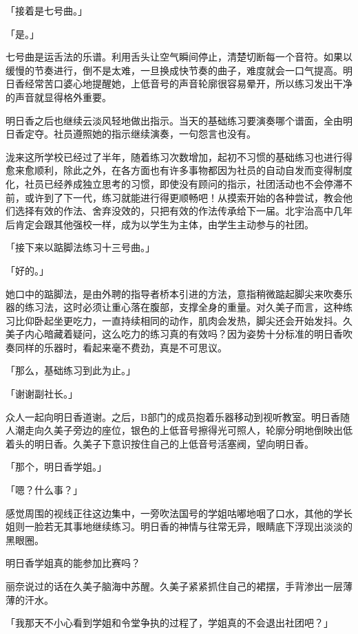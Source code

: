 \documentclass[UTF8]{ctexart}
\begin{document}
    「接着是七号曲。」 

    「是。」 

    七号曲是运舌法的乐谱。利用舌头让空气瞬间停止，清楚切断每一个音符。如果以缓慢的节奏进行，倒不是太难，一旦换成快节奏的曲子，难度就会一口气提高。明日香经常苦口婆心地提醒她，上低音号的声音轮廓很容易晕开，所以练习发出干净的声音就显得格外重要。 

    明日香之后也继续云淡风轻地做出指示。当天的基础练习要演奏哪个谱面，全由明日香定夺。社员遵照她的指示继续演奏，一句怨言也没有。 

    泷来这所学校已经过了半年，随着练习次数增加，起初不习惯的基础练习也进行得愈来愈顺利，除此之外，在各方面也有许多事物都因为社员的自动自发而变得制度化，社员已经养成独立思考的习惯，即使没有顾问的指示，社团活动也不会停滞不前，或许到了下一代，练习就能进行得更顺畅吧！从摸索开始的各种尝试，教会他们选择有效的作法、舍弃没效的，只把有效的作法传承给下一届。北宇治高中几年后肯定会跟其他强校一样，成为以学生为主体，由学生主动参与的社团。 

    「接下来以踮脚法练习十三号曲。」 

    「好的。」 

    她口中的踮脚法，是由外聘的指导者桥本引进的方法，意指稍微踮起脚尖来吹奏乐器的练习法，这时必须让重心落在腹部，支撑全身的重量。对久美子而言，这种练习比仰卧起坐更吃力，一直持续相同的动作，肌肉会发热，脚尖还会开始发抖。久美子内心暗藏着疑问，这么吃力的练习真的有效吗？因为姿势十分标准的明日香吹奏同样的乐器时，看起来毫不费劲，真是不可思议。 

    「那么，基础练习到此为止。」 

    「谢谢副社长。」 

    众人一起向明日香道谢。之后，B部门的成员抱着乐器移动到视听教室。明日香随人潮走向久美子旁边的座位，银色的上低音号擦得光可照人，轮廓分明地倒映出低着头的明日香。久美子下意识按住自己的上低音号活塞阀，望向明日香。 

    「那个，明日香学姐。」 

    「嗯？什么事？」 

    感觉周围的视线正往这边集中，一旁吹法国号的学姐咕嘟地咽了口水，其他的学长姐则一脸若无其事地继续练习。明日香的神情与往常无异，眼睛底下浮现出淡淡的黑眼圈。 

    明日香学姐真的能参加比赛吗？ 

    丽奈说过的话在久美子脑海中苏醒。久美子紧紧抓住自己的裙摆，手背渗出一层薄薄的汗水。 

    「我那天不小心看到学姐和令堂争执的过程了，学姐真的不会退出社团吧？」 
\end{document}
